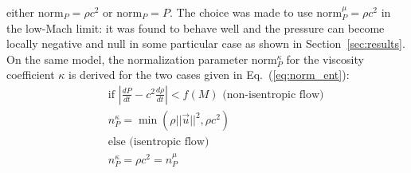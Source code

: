 \documentclass[preprint,10pt]{elsarticle}
\newcommand{\norm}{\textrm{norm}}
\renewcommand{\Re}{\textrm{Re\,}}
\newcommand{\eqt}[1]{Eq.~(\ref{#1})}                     %
\newcommand{\sct}[1]{Section~\ref{#1}}                   %
\begin{document}
either $\norm_P = \rho c^2$ or $\norm_P = P$. The choice was made to use $\norm_P^{\mu} = \rho c^2$ in the low-Mach limit: it was found to behave well and the pressure can become locally negative and null in some particular case as shown in \sct{sec:results}. \\
On the same model, the normalization parameter $\norm_P^{\kappa}$ for the viscosity coefficient $\kappa$ is derived for the two cases given in \eqt{eq:norm_ent}:
\begin{eqnarray}  \label{eq:norm_ent2}
&&\text{if } \left| \frac{dP}{dt} - c^2 \frac{d \rho}{dt}\right| < f(M) \text{ (non-isentropic flow)}\nonumber \\
&&n_{P}^{\kappa} =\min( \rho ||\vec{u} ||^2, \rho c^2  ) \nonumber \\
&&\text{else (isentropic flow)}\\
&&n_{P}^{\kappa} = \rho c^2 = n_{P}^{\mu} \nonumber
\end{eqnarray}
\end{document}
